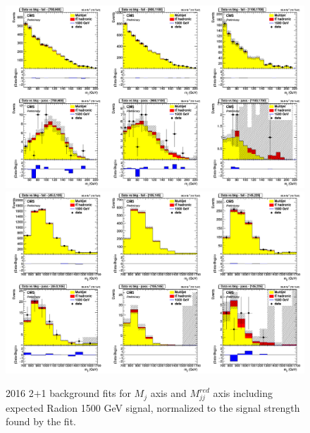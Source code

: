\begin{figure}[!htb]
	\centering
	\includegraphics[width=1\textwidth]{Figures/postfit_projx_fits_1621.png}
	\includegraphics[width=1\textwidth]{Figures/postfit_projy_fits_1621.png}
	\caption{2016 2$+$1 background fits for $M_j$ axis and $M_{jj}^{red}$ axis including expected Radion 1500 GeV signal, normalized to the signal strength found by the fit.}
	\label{fig:1621}
\end{figure}
